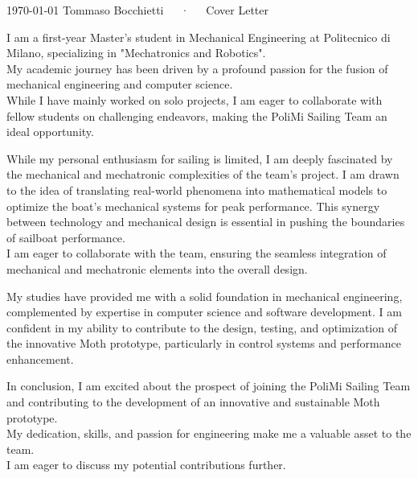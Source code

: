 \documentclass[11pt, a4paper]{awesome-cv}
\begin{document}
\makecvheader[R]

\makecvfooter
{\today}
{Tommaso Bocchietti~~~·~~~Cover Letter}
{}

\makelettertitle

\begin{cvletter}

  I am a first-year Master's student in Mechanical Engineering at Politecnico di Milano, specializing in "Mechatronics and Robotics".\\
  My academic journey has been driven by a profound passion for the fusion of mechanical engineering and computer science.\\
  While I have mainly worked on solo projects, I am eager to collaborate with fellow students on challenging endeavors, making the PoliMi Sailing Team an ideal opportunity.

  While my personal enthusiasm for sailing is limited, I am deeply fascinated by the mechanical and mechatronic complexities of the team's project.
  I am drawn to the idea of translating real-world phenomena into mathematical models to optimize the boat's mechanical systems for peak performance.
  This synergy between technology and mechanical design is essential in pushing the boundaries of sailboat performance.\\
  I am eager to collaborate with the team, ensuring the seamless integration of mechanical and mechatronic elements into the overall design.

  My studies have provided me with a solid foundation in mechanical engineering, complemented by expertise in computer science and software development.
  I am confident in my ability to contribute to the design, testing, and optimization of the innovative Moth prototype, particularly in control systems and performance enhancement.

  In conclusion, I am excited about the prospect of joining the PoliMi Sailing Team and contributing to the development of an innovative and sustainable Moth prototype.\\
  My dedication, skills, and passion for engineering make me a valuable asset to the team.\\
  I am eager to discuss my potential contributions further.

\end{cvletter}



\makeletterclosing
\end{document}
